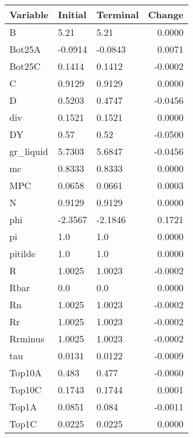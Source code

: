 \begin{table}
\centering
\label{tab:stst_comparison_low_beta_limit_permanent}
\begin{tabular}{lllr}
\toprule
                Variable & Initial & Terminal &  Change \\
\midrule
                       B &    5.21 &     5.21 &  0.0000 \\
                  Bot25A & -0.0914 &  -0.0843 &  0.0071 \\
                  Bot25C &  0.1414 &   0.1412 & -0.0002 \\
                       C &  0.9129 &   0.9129 &  0.0000 \\
                       D &  0.5203 &   0.4747 & -0.0456 \\
                     div &  0.1521 &   0.1521 &  0.0000 \\
                      DY &    0.57 &     0.52 & -0.0500 \\
               gr\_liquid &  5.7303 &   5.6847 & -0.0456 \\
                      mc &  0.8333 &   0.8333 &  0.0000 \\
                     MPC &  0.0658 &   0.0661 &  0.0003 \\
                       N &  0.9129 &   0.9129 &  0.0000 \\
                     phi & -2.3567 &  -2.1846 &  0.1721 \\
                      pi &     1.0 &      1.0 &  0.0000 \\
                 pitilde &     1.0 &      1.0 &  0.0000 \\
                       R &  1.0025 &   1.0023 & -0.0002 \\
                    Rbar &     0.0 &      0.0 &  0.0000 \\
                      Rn &  1.0025 &   1.0023 & -0.0002 \\
                      Rr &  1.0025 &   1.0023 & -0.0002 \\
                 Rrminus &  1.0025 &   1.0023 & -0.0002 \\
                     tau &  0.0131 &   0.0122 & -0.0009 \\
                  Top10A &   0.483 &    0.477 & -0.0060 \\
                  Top10C &  0.1743 &   0.1744 &  0.0001 \\
                   Top1A &  0.0851 &    0.084 & -0.0011 \\
                   Top1C &  0.0225 &   0.0225 &  0.0000 \\

\end{tabular}
\end{table}
